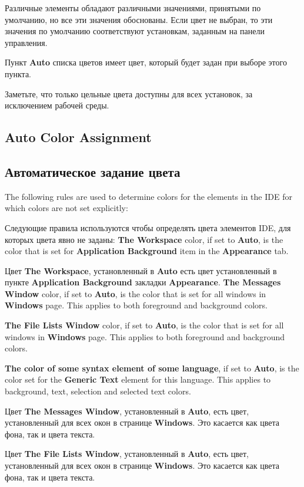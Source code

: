 Различные элементы обладают различными значениями, принятыми по умолчанию, но
все эти значения обоснованы. Если цвет не выбран, то эти значения по умолчанию 
соответствуют установкам, заданным на панели управления.

Пункт {\bf Auto} списка цветов имеет цвет, который будет задан при выборе этого 
пункта.

Заметьте, что только цельные цвета доступны для всех установок, за исключением 
рабочей среды.
\fi
\ifenglish
\subsection{Auto Color Assignment}
\else
\subsection{Автоматическое задание цвета}
\fi
{}

\ifenglish
The following rules are used to determine colors for the elements in the IDE
for which colors are not set explicitly:

\else
Следующие правила используются чтобы определять цвета элементов IDE, для которых 
цвета явно не заданы:
\fi
\ifenglish
{\bf The Workspace} color, if set to {\bf Auto}, is the color that is 
set for {\bf Application Background} item in the {\bf Appearance} tab.

\else
Цвет {\bf The Workspace}, установленный в {\bf Auto} есть цвет установленный 
в пункте {\bf Application Background} закладки {\bf Appearance}.
\fi
\ifenglish
{\bf The Messages Window} color, if set to {\bf Auto}, is the color that
is set for all windows in {\bf Windows} page. This applies to both
foreground and background colors.

{\bf The File Lists Window} color, if set to {\bf Auto}, is the color that
is set for all windows in {\bf Windows} page. This applies to both
foreground and background colors.

{\bf The color of some syntax element of some language}, if set to {\bf Auto},
is the color set for the {\bf Generic Text} element for this language. This applies
to background, text, selection and selected text colors.

\else
Цвет {\bf The Messages Window}, установленный в {\bf Auto}, есть цвет, 
установленный для всех окон в странице {\bf Windows}. Это касается как цвета 
фона, так и цвета текста.

Цвет {\bf The File Lists Window}, установленный в {\bf Auto}, есть цвет, 
установленный для всех окон в странице {\bf Windows}. Это касается как цвета 
фона, так и цвета текста.

